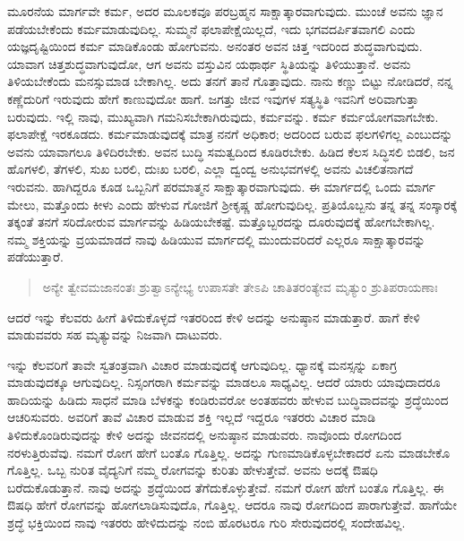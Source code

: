 ಮೂರನೆಯ ಮಾರ್ಗವೇ ಕರ್ಮ, ಅದರ ಮೂಲಕವೂ ಪರಬ್ರಹ್ಮನ ಸಾಕ್ಷಾತ್ಕಾರವಾಗುವುದು. ಮುಂಚೆ ಅವನು ಜ್ಞಾನ ಪಡೆಯಬೇಕೆಂದು ಕರ್ಮಮಾಡುವುದಿಲ್ಲ. ಸುಮ್ಮನೆ ಫಲಾಪೇಕ್ಷೆಯಿಲ್ಲದೆ, ಇದು ಭಗವದರ್ಪಿತವಾಗಲಿ ಎಂದು ಯಜ್ಞದೃಷ್ಟಿಯಿಂದ ಕರ್ಮ ಮಾಡಿಕೊಂಡು ಹೋಗುವನು. ಅನಂತರ ಅವನ ಚಿತ್ತ ಇದರಿಂದ ಶುದ್ಧವಾಗುವುದು. ಯಾವಾಗ ಚಿತ್ತಶುದ್ಧವಾಗುವುದೋ, ಆಗ ಅವನು ವಸ್ತುವಿನ ಯಥಾರ್ಥ ಸ್ಥಿತಿಯನ್ನು ತಿಳಿಯುತ್ತಾನೆ. ಅವನು ತಿಳಿಯಬೇಕೆಂದು ಮನಸ್ಸುಮಾಡ ಬೇಕಾಗಿಲ್ಲ. ಅದು ತನಗೆ ತಾನೆ ಗೊತ್ತಾವುದು. ನಾನು ಕಣ್ಣು ಬಿಟ್ಟು ನೋಡಿದರೆ, ನನ್ನ ಕಣ್ಣೆದುರಿಗೆ ಇರುವುದು ಹೇಗೆ ಕಾಣುವುದೋ ಹಾಗೆ. ಜಗತ್ತು ಜೀವ ಇವುಗಳ ಸತ್ಯಸ್ಥಿತಿ ಇವನಿಗೆ ಅರಿವಾಗುತ್ತಾ ಬರುವುದು. ಇಲ್ಲಿ ನಾವು, ಮುಖ್ಯವಾಗಿ ಗಮನಿಸಬೇಕಾಗಿರುವುದು, ಕರ್ಮವನ್ನು. ಕರ್ಮ ಕರ್ಮಯೋಗವಾಗಬೇಕು. ಫಲಾಪೇಕ್ಷೆ ಇರಕೂಡದು. ಕರ್ಮಮಾಡುವುದಕ್ಕೆ ಮಾತ್ರ ನನಗೆ ಅಧಿಕಾರ; ಅದರಿಂದ ಬರುವ ಫಲಗಳಿಗಲ್ಲ ಎಂಬುದನ್ನು ಅವನು ಯಾವಾಗಲೂ ತಿಳಿದಿರಬೇಕು. ಅವನ ಬುದ್ಧಿ ಸಮತ್ವದಿಂದ ಕೂಡಿರಬೇಕು. ಹಿಡಿದ ಕೆಲಸ ಸಿದ್ಧಿಸಲಿ ಬಿಡಲಿ, ಜನ ಹೊಗಳಲಿ, ತೆಗಳಲಿ, ಸುಖ ಬರಲಿ, ದುಃಖ ಬರಲಿ, ಎಲ್ಲಾ ದ್ವಂದ್ವ ಅನುಭವಗಳಲ್ಲಿ ಅವನು ವಿಚಲಿತನಾಗದೆ ಇರುವನು. ಹಾಗಿದ್ದರೂ ಕೂಡ ಒಬ್ಬನಿಗೆ ಪರಮಾತ್ಮನ ಸಾಕ್ಷಾತ್ಕಾರವಾಗುವುದು. ಈ ಮಾರ್ಗದಲ್ಲಿ ಒಂದು ಮಾರ್ಗ ಮೇಲು, ಮತ್ತೊಂದು ಕೀಳು ಎಂದು ಹೇಳುವ ಗೋಜಿಗೆ ಶ್ರೀಕೃಷ್ಣ ಹೋಗುವುದಿಲ್ಲ. ಪ್ರತಿಯೊಬ್ಬನು ತನ್ನ ತನ್ನ ಸಂಸ್ಕಾರಕ್ಕೆ ತಕ್ಕಂತೆ ತನಗೆ ಸರಿದೋರುವ ಮಾರ್ಗವನ್ನು ಹಿಡಿಯಬೇಕಷ್ಟೆ. ಮತ್ತೊಬ್ಬರದನ್ನು ದೂರುವುದಕ್ಕೆ ಹೋಗಬೇಕಾಗಿಲ್ಲ. ನಮ್ಮ ಶಕ್ತಿಯನ್ನು ವ್ರಯಮಾಡದೆ ನಾವು ಹಿಡಿಯುವ ಮಾರ್ಗದಲ್ಲಿ ಮುಂದುವರಿದರೆ ಎಲ್ಲರೂ ಸಾಕ್ಷಾತ್ಕಾರವನ್ನು ಪಡೆಯುತ್ತಾರೆ.

\begin{verse}
ಅನ್ಯೇ ತ್ವೇವಮಜಾನಂತಃ ಶ್ರುತ್ವಾಽನ್ಯೇಭ್ಯ ಉಪಾಸತೇ ತೇಽಪಿ ಚಾತಿತರಂತ್ಯೇವ ಮೃತ್ಯುಂ ಶ್ರುತಿಪರಾಯಣಾಃ 
\end{verse}

{\small ಆದರೆ ಇನ್ನು ಕೆಲವರು ಹೀಗೆ ತಿಳಿದುಕೊಳ್ಳದೆ ಇತರರಿಂದ ಕೇಳಿ ಅದನ್ನು ಅನುಷ್ಠಾನ ಮಾಡುತ್ತಾರೆ. ಹಾಗೆ ಕೇಳಿ ಮಾಡುವವರು ಸಹ ಮೃತ್ಯುವನ್ನು ನಿಜವಾಗಿ ದಾಟುವರು.}

ಇನ್ನು ಕೆಲವರಿಗೆ ತಾವೇ ಸ್ವತಂತ್ರವಾಗಿ ವಿಚಾರ ಮಾಡುವುದಕ್ಕೆ ಆಗುವುದಿಲ್ಲ. ಧ್ಯಾನಕ್ಕೆ ಮನಸ್ಸನ್ನು ಏಕಾಗ್ರ ಮಾಡುವುದಕ್ಕೂ ಆಗುವುದಿಲ್ಲ. ನಿಸ್ಸಂಗರಾಗಿ ಕರ್ಮವನ್ನು ಮಾಡಲೂ ಸಾಧ್ಯವಿಲ್ಲ. ಆದರೆ ಯಾರು ಯಾವುದಾದರೂ ಹಾದಿಯನ್ನು ಹಿಡಿದು ಸಾಧನೆ ಮಾಡಿ ಬೆಳಕನ್ನು ಕಂಡಿರುವರೋ ಅಂತಹವರು ಹೇಳುವ ಬುದ್ಧಿವಾದವನ್ನು ಶ್ರದ್ಧೆಯಿಂದ ಆಚರಿಸುವರು. ಅವರಿಗೆ ತಾವೆ ವಿಚಾರ ಮಾಡುವ ಶಕ್ತಿ ಇಲ್ಲದೆ ಇದ್ದರೂ ಇತರರು ವಿಚಾರ ಮಾಡಿ ತಿಳಿದುಕೊಂಡಿರುವುದನ್ನು ಕೇಳಿ ಅದನ್ನು ಜೀವನದಲ್ಲಿ ಅನುಷ್ಠಾನ ಮಾಡುವರು. ನಾವೊಂದು ರೋಗದಿಂದ ನರಳುತ್ತಿರುವೆವು. ನಮಗೆ ರೋಗ ಹೇಗೆ ಬಂತೊ ಗೊತ್ತಿಲ್ಲ. ಅದನ್ನು ಗುಣಮಾಡಿಕೊಳ್ಳಬೇಕಾದರೆ ಏನು ಮಾಡಬೇಕೊ ಗೊತ್ತಿಲ್ಲ. ಒಬ್ಬ ನುರಿತ ವೈದ್ಯನಿಗೆ ನಮ್ಮ ರೋಗವನ್ನು ಕುರಿತು ಹೇಳುತ್ತೇವೆ. ಅವನು ಅದಕ್ಕೆ ಔಷಧಿ ಬರೆದುಕೊಡುತ್ತಾನೆ. ನಾವು ಅದನ್ನು ಶ್ರದ್ಧೆಯಿಂದ ತೆಗೆದುಕೊಳ್ಳುತ್ತೇವೆ. ನಮಗೆ ರೋಗ ಹೇಗೆ ಬಂತೊ ಗೊತ್ತಿಲ್ಲ. ಈ ಔಷಧಿ ಹೇಗೆ ರೋಗವನ್ನು ಹೋಗಲಾಡಿಸುವುದೊ, ಗೊತ್ತಿಲ್ಲ. ಆದರೂ ನಾವು ರೋಗದಿಂದ ಪಾರಾಗುತ್ತೇವೆ. ಹಾಗೆಯೇ ಶ್ರದ್ಧೆ ಭಕ್ತಿಯಿಂದ ನಾವು ಇತರರು ಹೇಳಿದುದನ್ನು ನಂಬಿ ಹೊರಟರೂ ಗುರಿ ಸೇರುವುದರಲ್ಲಿ ಸಂದೇಹವಿಲ್ಲ.

